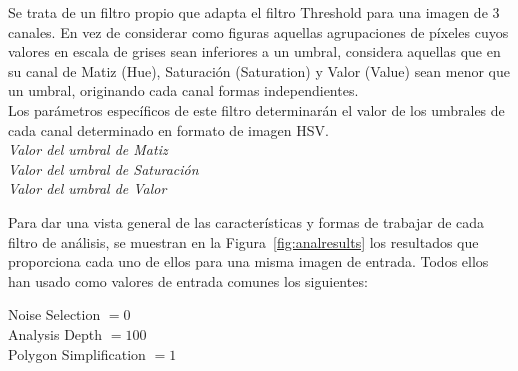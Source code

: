		Se trata de un filtro propio que adapta el filtro Threshold para una imagen de 3 canales. En vez de considerar como figuras aquellas agrupaciones de píxeles cuyos valores en escala de grises sean inferiores a un umbral, considera aquellas que en su canal de Matiz (Hue), Saturación (Saturation) y Valor (Value) sean menor que un umbral, originando cada canal formas independientes.\\
		
		Los parámetros específicos de este filtro determinarán el valor de los umbrales de cada canal determinado en formato de imagen HSV.\\		
		
		\noindent\textit{Valor del umbral de Matiz}\\
		\noindent\textit{Valor del umbral de Saturación}\\
		\noindent\textit{Valor del umbral de Valor}

		
		\color{blue}
		
		\vspace{0.5in}Para dar una vista general de las características y formas de trabajar de cada filtro de análisis, se muestran en la Figura~\ref{fig:analresults} los resultados que proporciona cada uno de ellos para una misma imagen de entrada. Todos ellos han usado como valores de entrada comunes los siguientes:

		
		\begin{center}
			Noise Selection $= 0$\\
			Analysis Depth $= 100$\\
			Polygon Simplification $= 1$\\
		\end{center}
		
